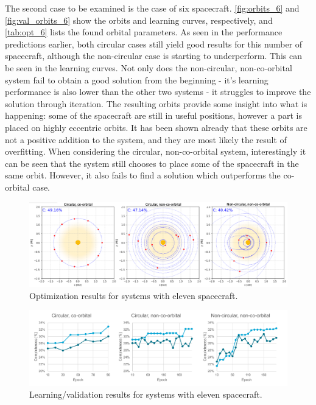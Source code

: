 The second case to be examined is the case of six spacecraft. \autoref{fig:orbits_6} and \autoref{fig:val_orbits_6} show the orbits and learning curves, respectively, and \autoref{tab:opt_6} lists the found orbital parameters. As seen in the performance predictions earlier, both circular cases still yield good results for this number of spacecraft, although the non-circular case is starting to underperform. This can be seen in the learning curves. Not only does the non-circular, non-co-orbital system fail to obtain a good solution from the beginning - it's learning performance is also lower than the other two systems - it struggles to improve the solution through iteration. The resulting orbits provide some insight into what is happening: some of the spacecraft are still in useful positions, however a part is placed on highly eccentric orbits. It has been shown already that these orbits are not a positive addition to the system, and they are most likely the result of overfitting. When considering the circular, non-co-orbital system, interestingly it can be seen that the system still chooses to place some of the spacecraft in the same orbit. However, it also fails to find a solution which outperforms the co-orbital case. \\

\begin{figure}[htbp]
 \centering
 \includegraphics[width=1.0\textwidth]{img/orbits_11.png}
 \caption{Optimization results for systems with eleven spacecraft.}
 \label{fig:orbits_11}
\end{figure}
\begin{figure}[htbp]
 \centering
 \includegraphics[width=1.0\textwidth]{img/val_orbits_11.pdf}
 \caption{Learning/validation results for systems with eleven spacecraft.}
 \label{fig:val_orbits_11}
\end{figure}

